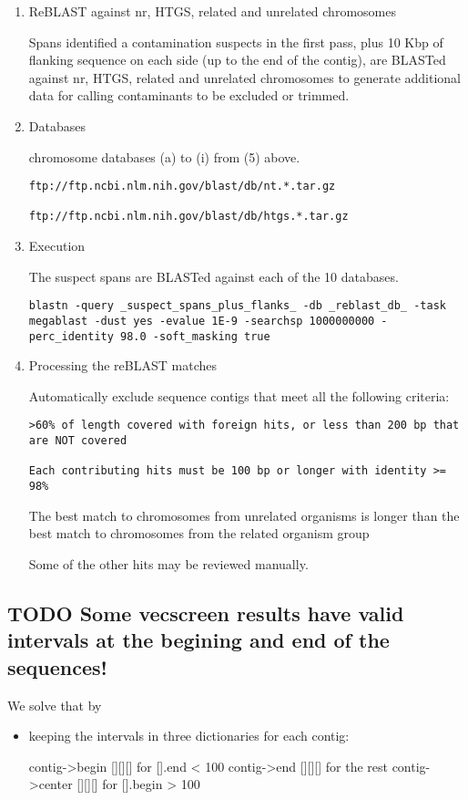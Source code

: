 \documentclass[11pt]{article}
\begin{document}
\begin{enumerate}
\item ReBLAST against nr, HTGS, related and unrelated chromosomes
\label{sec:orgc3da149}


Spans identified a contamination suspects in the first pass, plus 10 Kbp
of flanking sequence on each side (up to the end of the contig), are
BLASTed against nr, HTGS, related and unrelated chromosomes to generate
additional data for calling contaminants to be excluded or trimmed.

\item Databases
\label{sec:orgb97730a}


chromosome databases (a) to (i) from (5) above.

\begin{verbatim}
ftp://ftp.ncbi.nlm.nih.gov/blast/db/nt.*.tar.gz

ftp://ftp.ncbi.nlm.nih.gov/blast/db/htgs.*.tar.gz
\end{verbatim}

\item Execution
\label{sec:orga6b1abb}


The suspect spans are BLASTed against each of the 10 databases.

\begin{verbatim}
blastn -query _suspect_spans_plus_flanks_ -db _reblast_db_ -task megablast -dust yes -evalue 1E-9 -searchsp 1000000000 -perc_identity 98.0 -soft_masking true
\end{verbatim}

\item Processing the reBLAST matches
\label{sec:orgcb1e852}

Automatically exclude sequence contigs that meet all the following
criteria:

\begin{verbatim}
>60% of length covered with foreign hits, or less than 200 bp that are NOT covered

Each contributing hits must be 100 bp or longer with identity >= 98%
\end{verbatim}

The best match to chromosomes from unrelated organisms is longer than
the best match to chromosomes from the related organism group

Some of the other hits may be reviewed manually.
\end{enumerate}


\subsection{{\bfseries\sffamily TODO} Some vecscreen results have valid intervals at the begining and end of the sequences!}
\label{sec:orga002a2b}
We solve that by 
\begin{itemize}
\item keeping the intervals in three dictionaries for each contig:

contig->begin [][][] for [].end < 100
contig->end [][][]   for the rest
contig->center [][][] for   [].begin > 100
\end{itemize}
\end{document}
